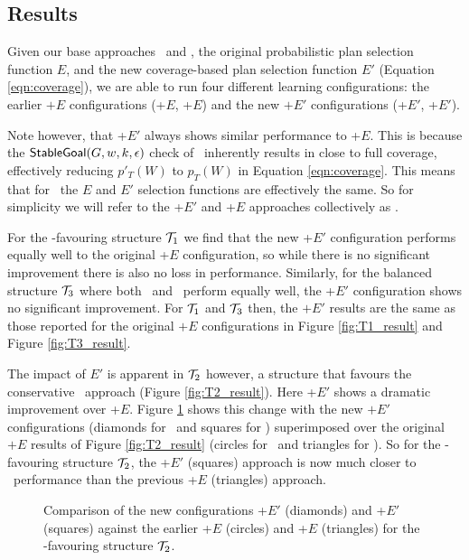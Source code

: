 \subsection{Results}

Given our base approaches \CL\ and \BUL, the original probabilistic
plan selection function $E$, and the new coverage-based plan selection
function $E'$ (Equation \ref{eqn:coverage}), we are able to run four
different learning configurations: the earlier $+E$ configurations
(\CL+$E$, \BUL+$E$) and the new $+E'$ configurations (\CL+$E'$,
\BUL+$E'$). 

Note however, that \BUL+$E'$ always shows similar performance to
\BUL+$E$. This is because the $\mathsf{StableGoal}(G,w,k,\epsilon)$ check of
\BUL\ inherently results in close to full coverage, effectively
reducing $p'_T(W)$ to $p_T(W)$ in Equation \ref{eqn:coverage}. This
means that for \BUL\, the $E$ and $E'$ selection functions are
effectively the same. So for simplicity we will refer to the \BUL+$E'$
and \BUL+$E$ approaches collectively as \BUL. 

For the \CL-favouring structure ${\mathcal{T}}_1$ we find that the new \CL+$E'$
configuration performs equally well to the original \CL+$E$
configuration, so while there is no significant improvement there is
also no loss in performance. Similarly, for the balanced structure
${\mathcal{T}}_3$ where both \CL\ and \BUL\ perform equally well, the \CL+$E'$
configuration shows no significant improvement. For ${\mathcal{T}}_1$ and ${\mathcal{T}}_3$
then, the $+E'$ results are the same as those reported for the
original $+E$ configurations in Figure \ref{fig:T1_result} and Figure
\ref{fig:T3_result}. 

The impact of $E'$ is apparent in ${\mathcal{T}}_2$ however, a structure that
favours the conservative \BUL\ approach (Figure
\ref{fig:T2_result}). Here \CL+$E'$ shows a dramatic improvement over
\CL+$E$. Figure \ref{fig:T2_result2} shows this change with the new
$+E'$ configurations (diamonds for \BUL\ and squares for \CL)
superimposed over the original $+E$ results of Figure
\ref{fig:T2_result} (circles for \BUL\ and triangles for \CL). So for
the \BUL-favouring structure ${\mathcal{T}}_2$, the \CL+$E'$ (squares) approach
is now much closer to \BUL\ performance than the previous \CL+$E$
(triangles) approach. 

\begin{figure}[ht]
\begin{center}

\end{center}
\caption{Comparison of the new configurations \BUL+$E'$ (diamonds) and \CL+$E'$ (squares) against the earlier \BUL+$E$ (circles) and \CL+$E$ (triangles) for the \BUL-favouring structure ${\mathcal{T}}_2$.}
\label{fig:T2_result2}
\end{figure}

